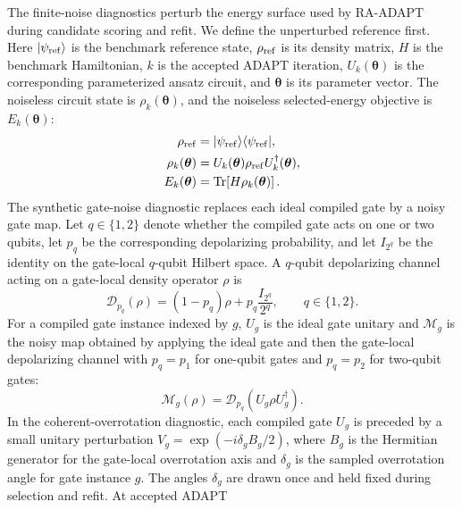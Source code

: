 \documentclass[
  reprint,
  amsmath,
  amssymb,
  aps,
  pra,
  nofootinbib,
  superscriptaddress,
  floatfix
]{revtex4-2}
\newcommand{\ket}[1]{|#1\rangle}
\newcommand{\bra}[1]{\langle #1|}
\begin{document}
The finite-noise diagnostics perturb the energy surface used by RA-ADAPT during
candidate scoring and refit. We define the unperturbed reference first. Here
\(\ket{\psi_{\rm ref}}\) is the benchmark reference state, \(\rho_{\rm ref}\)
is its density matrix, \(H\) is the benchmark Hamiltonian, \(k\) is the accepted
ADAPT iteration, \(U_k(\boldsymbol{\theta})\) is the corresponding parameterized
ansatz circuit, and \(\boldsymbol{\theta}\) is its parameter vector. The
noiseless circuit state is \(\rho_k(\boldsymbol{\theta})\), and the noiseless
selected-energy objective is \(E_k(\boldsymbol{\theta})\):
\begin{equation*}
\begin{aligned}
\rho_{\rm ref}
&=\ket{\psi_{\rm ref}}\bra{\psi_{\rm ref}},
\\
\rho_k(\boldsymbol{\theta})
&=U_k(\boldsymbol{\theta})\rho_{\rm ref}U_k^\dagger(\boldsymbol{\theta}),
\\
E_k(\boldsymbol{\theta})
&=\operatorname{Tr}\!\left[H\rho_k(\boldsymbol{\theta})\right].
\end{aligned}
\end{equation*}
The synthetic gate-noise diagnostic replaces each ideal compiled gate by a
noisy gate map. Let \(q\in\{1,2\}\) denote whether the compiled gate acts on one
or two qubits, let \(p_q\) be the corresponding depolarizing probability, and
let \(I_{2^q}\) be the identity on the gate-local \(q\)-qubit Hilbert space. A
\(q\)-qubit depolarizing channel acting on a gate-local density operator
\(\rho\) is
\begin{equation*}
\mathcal D_{p_q}(\rho)
=(1-p_q)\rho+p_q\frac{I_{2^q}}{2^q},
\qquad
q\in\{1,2\}.
\end{equation*}
For a compiled gate instance indexed by \(g\), \(U_g\) is the ideal gate unitary
and \(\mathcal M_g\) is the noisy map obtained by applying the ideal gate and
then the gate-local depolarizing channel with \(p_q=p_1\) for one-qubit gates
and \(p_q=p_2\) for two-qubit gates:
\begin{equation*}
\mathcal M_g(\rho)
=
\mathcal D_{p_q}\!\left(U_g\rho U_g^\dagger\right).
\end{equation*}
In the coherent-overrotation diagnostic, each compiled gate \(U_g\) is preceded
by a small unitary perturbation \(V_g=\exp(-i\delta_gB_g/2)\), where \(B_g\) is
the Hermitian generator for the gate-local overrotation axis and \(\delta_g\) is
the sampled overrotation angle for gate instance \(g\). The angles \(\delta_g\)
are drawn once and held fixed during selection and refit. At accepted ADAPT
\end{document}
